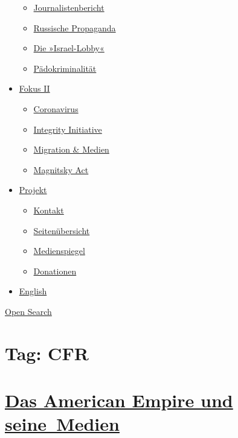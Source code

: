 \begin{itemize}
  \begin{itemize}
  \tightlist
  \item
    \href{https://swprs.org/bericht-eines-journalisten/}{Journalistenbericht}
  \item
    \href{https://swprs.org/russische-propaganda/}{Russische Propaganda}
  \item
    \href{https://swprs.org/die-israel-lobby-fakten-und-mythen/}{Die
    »Israel-Lobby«}
  \item
    \href{https://swprs.org/geopolitik-und-paedokriminalitaet/}{Pädokriminalität}
  \end{itemize}
\item
  \href{https://swprs.org/migration-und-medien/}{Fokus II}

  \begin{itemize}
  \tightlist
  \item
    \href{https://swprs.org/covid-19-hinweis-ii/}{Coronavirus}
  \item
    \href{https://swprs.org/die-integrity-initiative/}{Integrity
    Initiative}
  \item
    \href{https://swprs.org/migration-und-medien/}{Migration \& Medien}
  \item
    \href{https://swprs.org/der-fall-magnitsky/}{Magnitsky Act}
  \end{itemize}
\item
  \href{https://swprs.org/kontakt/}{Projekt}

  \begin{itemize}
  \tightlist
  \item
    \href{https://swprs.org/kontakt/}{Kontakt}
  \item
    \href{https://swprs.org/uebersicht/}{Seitenübersicht}
  \item
    \href{https://swprs.org/medienspiegel/}{Medienspiegel}
  \item
    \href{https://swprs.org/donationen/}{Donationen}
  \end{itemize}
\item
  \href{https://swprs.org/contact/}{English}
\end{itemize}

\protect\hyperlink{}{Open Search}

\hypertarget{tag-cfr}{%
\section{Tag: CFR}\label{tag-cfr}}

\hypertarget{das-american-empire-und-seine-medien}{%
\section{\texorpdfstring{\href{https://swprs.org/2017/03/01/netzwerk-medien-usa/}{Das
American Empire und
seine~Medien}}{Das American Empire und seine~Medien}}\label{das-american-empire-und-seine-medien}}

